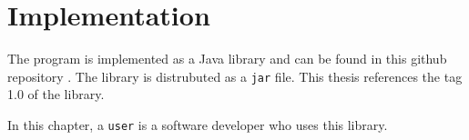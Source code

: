 \section{Implementation}

The program is implemented as a Java library and can be found in this github repository \cite{gp-modifiable-ast}.
The library is distrubuted as a \verb|jar| file.
This thesis references the tag 1.0 of the library.

In this chapter, a \verb|user| is a software developer who uses this library.











